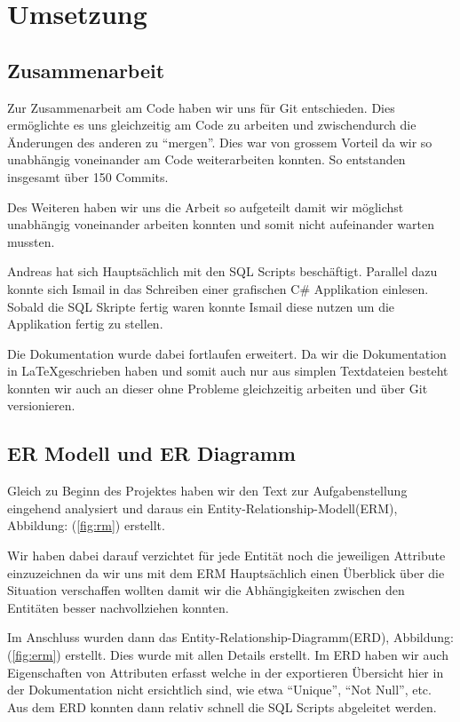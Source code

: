 \newpage

\section{Umsetzung}

\subsection{Zusammenarbeit}
Zur Zusammenarbeit am Code haben wir uns für Git entschieden. Dies
ermöglichte es uns gleichzeitig am Code zu arbeiten und zwischendurch
die Änderungen des anderen zu ``mergen''. Dies war von grossem Vorteil
da wir so unabhängig voneinander am Code weiterarbeiten konnten. So
entstanden insgesamt über 150 Commits.

Des Weiteren haben wir uns die Arbeit so aufgeteilt damit wir möglichst
unabhängig voneinander arbeiten konnten und somit nicht aufeinander
warten mussten.

Andreas hat sich Hauptsächlich mit den SQL Scripts beschäftigt.
Parallel dazu konnte sich Ismail in das Schreiben einer grafischen C\#
Applikation einlesen. Sobald die SQL Skripte fertig waren konnte
Ismail diese nutzen um die Applikation fertig zu stellen.

Die Dokumentation wurde dabei fortlaufen erweitert. Da wir die
Dokumentation in \LaTeX geschrieben haben und somit auch nur aus
simplen Textdateien besteht konnten wir auch an dieser ohne Probleme
gleichzeitig arbeiten und über Git versionieren.

\subsection{ER Modell und ER Diagramm}
Gleich zu Beginn des Projektes haben wir den Text zur Aufgabenstellung
eingehend analysiert und daraus ein Entity-Relationship-Modell(ERM),
Abbildung: (\ref{fig:rm}) erstellt.

Wir haben dabei darauf verzichtet für jede Entität noch die jeweiligen
Attribute einzuzeichnen da wir uns mit dem ERM Hauptsächlich einen
Überblick über die Situation verschaffen wollten damit wir die
Abhängigkeiten zwischen den Entitäten besser nachvollziehen konnten.

Im Anschluss wurden dann das Entity-Relationship-Diagramm(ERD),
Abbildung: (\ref{fig:erm}) erstellt. Dies wurde mit allen Details
erstellt. Im ERD haben wir auch Eigenschaften von Attributen erfasst
welche in der exportieren Übersicht hier in der Dokumentation nicht
ersichtlich sind, wie etwa ``Unique'', ``Not Null'', etc. Aus dem ERD
konnten dann relativ schnell die SQL Scripts abgeleitet werden.

